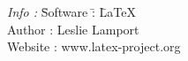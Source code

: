 \documentclass{article}
\begin{document}
	\begin{tabbing}
	\emph{Info : } \= Software \= : \= LaTeX \\
\> Author \> : \> Leslie Lamport \\
\> Website \> : \>www.latex-project.org
	\end{tabbing}
	
\end{document}
